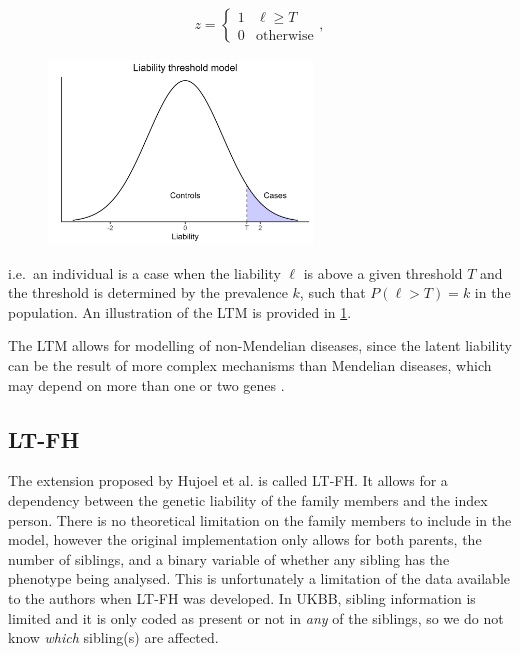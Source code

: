 \begin{align*}
z = 
\begin{cases}
1 & \ell \geq T \\
0 & \text{otherwise}
\end{cases},
\end{align*}
\begin{figure}
	\includegraphics[width=7cm]{methods/LTM.png}
	\label{fig:methods:LTMplot}
\end{figure}
i.e.\ an individual is a case when the liability $ \ell $ is above a given threshold $ T $ and the threshold is determined by the prevalence $ k $, such that $ P(\ell > T) = k $ in the population. An illustration of the LTM is provided in \cref{fig:methods:LTMplot}.

The LTM allows for modelling of non-Mendelian diseases, since the latent liability can be the result of more complex mechanisms than Mendelian diseases, which may depend on more than one or two genes \cite{falconer1967inheritance,falconer1965inheritance}. 


\subsection{LT-FH}
The extension proposed by Hujoel et al.\cite{hujoel2020liability} is called LT-FH. It allows for a dependency between the genetic liability of the family members and the index person. There is no theoretical limitation on the family members to include in the model, however the original implementation only allows for both parents, the number of siblings, and a binary variable of whether any sibling has the phenotype being analysed. This is unfortunately a limitation of the data available to the authors when LT-FH was developed. In UKBB, sibling information is limited and it is only coded as present or not in \textit{any} of the siblings, so we do not know \textit{which} sibling(s) are affected. 

